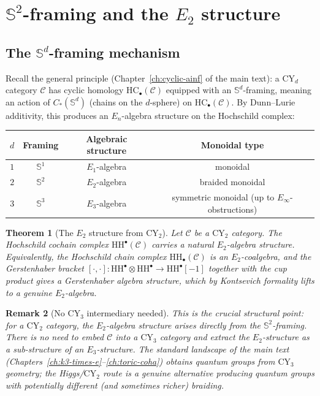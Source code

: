 \documentclass[11pt]{article}
\theoremstyle{garamondthm}
\newtheorem{theorem}{Theorem}[section]
\theoremstyle{garamonddef}
\theoremstyle{garamondrem}
\newtheorem{remark}[theorem]{Remark}
\newcommand{\Einf}{E_\infty}
\newcommand{\CY}{\mathrm{CY}}
\newcommand{\HH}{\mathrm{HH}}
\newcommand{\HC}{\mathrm{HC}}
\newcommand{\Eone}{E_1}
\newcommand{\Etwo}{E_2}
\newcommand{\En}{E_n}
\newcommand{\cC}{\mathcal{C}}
\begin{document}

\section{$\mathbb{S}^2$-framing and the $\Etwo$ structure}
\label{sec:e2-from-s2}

\subsection{The $\mathbb{S}^d$-framing mechanism}
\label{ssec:sd-framing}

Recall the general principle (Chapter~\ref{ch:cyclic-ainf} of the main text): a $\CY_d$ category $\cC$ has cyclic homology $\HC_\bullet(\cC)$ equipped with an $\mathbb{S}^d$-framing, meaning an action of $C_*(\mathbb{S}^d)$ (chains on the $d$-sphere) on $\HC_\bullet(\cC)$. By Dunn--Lurie additivity, this produces an $\En$-algebra structure on the Hochschild complex:

\begin{center}
\begin{tabular}{c|c|c|c}
$d$ & Framing & Algebraic structure & Monoidal type \\ \hline
$1$ & $\mathbb{S}^1$ & $\Eone$-algebra & monoidal \\
$2$ & $\mathbb{S}^2$ & $\Etwo$-algebra & braided monoidal \\
$3$ & $\mathbb{S}^3$ & $E_3$-algebra & symmetric monoidal (up to $\Einf$-obstructions)
\end{tabular}
\end{center}

\begin{theorem}[The $\Etwo$ structure from $\CY_2$]
\label{thm:cy2-e2}
Let $\cC$ be a $\CY_2$ category. The Hochschild cochain complex $\HH^\bullet(\cC)$ carries a natural $\Etwo$-algebra structure. Equivalently, the Hochschild chain complex $\HH_\bullet(\cC)$ is an $\Etwo$-coalgebra, and the Gerstenhaber bracket $[\cdot, \cdot] \colon \HH^\bullet \otimes \HH^\bullet \to \HH^\bullet[-1]$ together with the cup product gives a Gerstenhaber algebra structure, which by Kontsevich formality lifts to a genuine $\Etwo$-algebra.
\end{theorem}

\begin{remark}[No $\CY_3$ intermediary needed]
\label{rem:no-cy3}
This is the crucial structural point: for a $\CY_2$ category, the $\Etwo$-algebra structure arises \emph{directly} from the $\mathbb{S}^2$-framing. There is no need to embed $\cC$ into a $\CY_3$ category and extract the $\Etwo$-structure as a sub-structure of an $E_3$-structure. The standard landscape of the main text (Chapters~\ref{ch:k3-times-e}--\ref{ch:toric-coha}) obtains quantum groups from $\CY_3$ geometry; the Higgs/$\CY_2$ route is a genuine alternative producing quantum groups with potentially different (and sometimes richer) braiding.
\end{remark}
\end{document}
